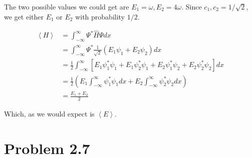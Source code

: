 \documentclass{article}
\newcommand{\bracket}[1]{\left[ #1 \right]}
\newcommand{\paren}[1]{\left( #1 \right)}
\newcommand{\braket}[1]{\left\langle #1 \right\rangle}
\newcommand{\intinf}{\int_{-\infty}^\infty}
\newenvironment{problem}{\begin{enumerate}[label=(\alph*)]}{\end{enumerate}}
\begin{document}
\begin{problem}
    The two possible values we could get are $E_1 = \omega, E_2 = 4 \omega$. 
    Since $c_1, c_2 = 1/\sqrt{2}$, we get either $E_1$ or $E_2$ with probability $1/2$.

    \begin{align*}
      \braket{H} &= \intinf \Psi^* \hat{H} \Psi dx \\
                 &= \intinf \Psi^* \frac{1}{\sqrt{2}}\paren{E_1 \psi_1 + E_2 \psi_2} dx \\
                 &= \frac{1}{2} \intinf \bracket{E_1 \psi_1^* \psi_1 + E_1 \psi_2^* \psi_1 + E_2 \psi_1^* \psi_2 + E_2 \psi_2^* \psi_2}dx \\
                 &= \frac{1}{2} \paren{E_1\intinf \psi_1^* \psi_1 dx + E_2 \intinf \psi_2^* \psi_2 dx} \\
                 &= \frac{E_1 + E_2}{2}
    \end{align*}

    Which, as we would expect is $\braket{E}$.

\end{problem}

\section*{Problem 2.7}
\end{document}
